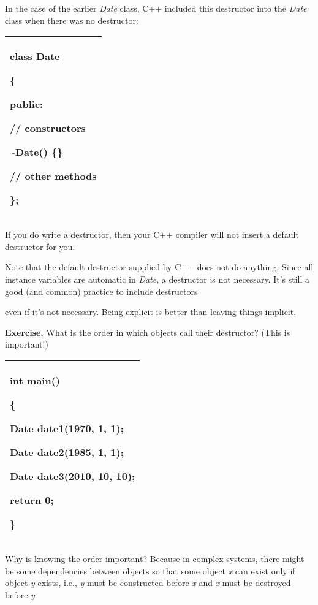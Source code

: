 \documentclass[
]{article}
\begin{document}
In the case of the earlier \emph{Date} class, C++ included this
destructor into the \emph{Date} class when there was no destructor:

\begin{longtable}[]{@{}l@{}}
\toprule
\endhead
\begin{minipage}[t]{0.97\columnwidth}\raggedright
class Date

\{

public:

// constructors

\textasciitilde Date() \{\}

// other methods

\};\strut
\end{minipage}\tabularnewline
\bottomrule
\end{longtable}

If you do write a destructor, then your C++ compiler will not insert a
default destructor for you.

Note that the default destructor supplied by C++ does not do anything.
Since all instance variables are automatic in \emph{Date}, a destructor
is not necessary. It's still a good (and common) practice to include
destructors

even if it's not necessary. Being explicit is better than leaving things
implicit.

\textbf{Exercise.} What is the order in which objects call their
destructor? (This is important!)

\begin{longtable}[]{@{}l@{}}
\toprule
\endhead
\begin{minipage}[t]{0.97\columnwidth}\raggedright
int main()

\{

Date date1(1970, 1, 1);

Date date2(1985, 1, 1);

Date date3(2010, 10, 10);

return 0;

\}\strut
\end{minipage}\tabularnewline
\bottomrule
\end{longtable}

Why is knowing the order important? Because in complex systems, there
might be some dependencies between objects so that some object \emph{x}
can exist only if object \emph{y} exists, i.e., \emph{y} must be
constructed before \emph{x} and \emph{x} must be destroyed before
\emph{y}.
\end{document}
